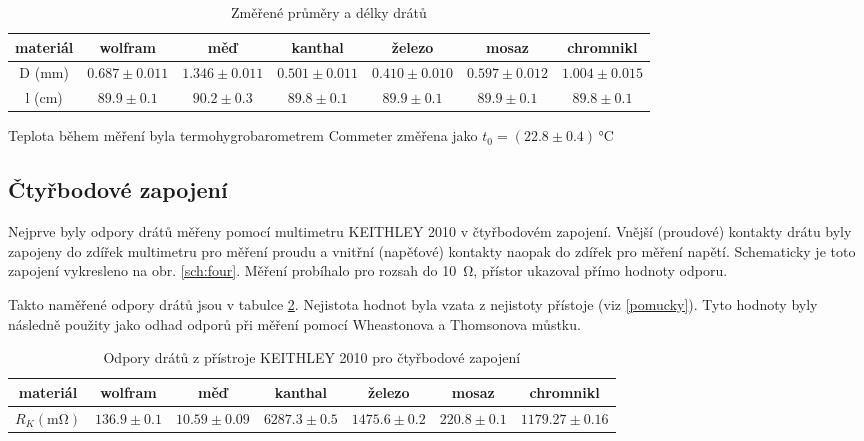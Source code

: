 \documentclass{../concepts/prepareprotokol} %
\begin{document}
\begin{table}[!hbtp]
\centering
\caption{Změřené průměry a délky drátů}
\begin{tabular}{c|cccccc}
 \toprule
 materiál & wolfram & měď & kanthal & železo & mosaz & chromnikl \\
 \midrule
 D (\si{\milli\metre}) & $0.687 \pm 0.011$ & $1.346 \pm 0.011$ & $0.501 \pm 0.011$ & $0.410 \pm 0.010$ & $0.597 \pm 0.012$ & $1.004 \pm 0.015$ \\
 l (\si{\centi\metre}) & $89.9 \pm 0.1$ & $90.2 \pm 0.3$ & $89.8 \pm 0.1$ & $89.9 \pm 0.1$ & $89.9 \pm 0.1$ & $89.8 \pm 0.1$ \\
 \bottomrule
\end{tabular}
\label{tab:delky}
\end{table}

Teplota během měření byla termohygrobarometrem Commeter změřena jako $t_0 = (22.8 \pm 0.4) \, \si{\celsius}$ 

\subsection{Čtyřbodové zapojení}

Nejprve byly odpory drátů měřeny pomocí multimetru KEITHLEY 2010 v čtyřbodovém zapojení. Vnější (proudové) kontakty drátu
byly zapojeny do zdířek multimetru pro měření proudu a vnitřní (napěťové) kontakty naopak do zdířek pro měření napětí. 
Schematicky je toto zapojení vykresleno na obr. \ref{sch:four}.
Měření probíhalo pro rozsah do \SI{10}{\ohm}, přístor ukazoval přímo hodnoty odporu.

Takto naměřené odpory drátů jsou v tabulce \ref{tab:keithley}. Nejistota hodnot byla vzata z nejistoty přístoje 
(viz \ref{pomucky}). Tyto hodnoty byly následně použity jako odhad odporů při měření pomocí Wheastonova a Thomsonova
můstku.

\begin{table}[!hbtp]
\centering
\caption{Odpory drátů z přístroje KEITHLEY 2010 pro čtyřbodové zapojení}
\begin{tabular}{c|cccccc}
 \toprule
 materiál & wolfram & měď & kanthal & železo & mosaz & chromnikl \\
 \midrule
 $R_K (\si{\milli\ohm})$ & $136.9 \pm 0.1$ & $10.59 \pm 0.09$ & $6287.3 \pm 0.5$ & $1475.6 \pm 0.2$ & $220.8 \pm 0.1$ & $1179.27 \pm 0.16$ \\
 \bottomrule
\end{tabular}
\label{tab:keithley}
\end{table}
\end{document}
